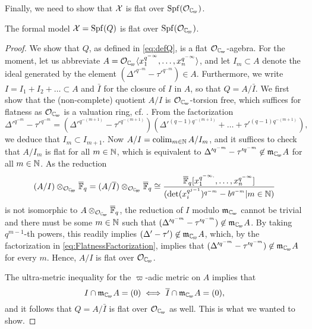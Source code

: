 \documentclass[../main.tex]{subfiles}
\begin{document}
Finally, we need to show that $\mathcal{X}$ is flat over $\spf(\cO_\Cp)$. 

\begin{prop}\label{prop:FlatnessOfFormalModel}
  The formal model $\mathcal{X} = \operatorname{Spf}(Q)$ is flat over $\spf(\cO_\Cp)$. 
\begin{proof}
  We show that $Q$, as defined in \eqref{eq:defQ}, is a flat $\cO_\Cp$-agebra.
  For the moment, let us abbreviate $A = \cO_\Cp\langle x_1^{q^{-\infty}}, \dots, 
  x_n^{q^{-\infty}}\rangle$, 
  and let $I_m \subset A$ denote the ideal generated by the element 
  $(\Delta'^{q^{-m}} - \tau'^{q^{-m}}) \in A$. Furthermore, we write $I = I_1 +
  I_2 + \dots \subset A$ 
  and $\bar I$ for the closure of $I$ in $A$, so that $Q = A/\bar I$. 
  We first show that the (non-complete) quotient $A/I$ is $\cO_\Cp$-torsion free, 
  which suffices for flatness as $\cO_\Cp$ is a valuation ring,
  cf. \cite[\href{https://stacks.math.columbia.edu/tag/0539}{Tag
  0539}]{stacks-project}. From the factorization 
  \begin{equation}\label{eq:FlatnessFactorization}
    \Delta'^{q^{-m}} - \tau'^{q^{-m}} = (\Delta'^{q^{-(m+1)}} - \tau'^{q^{-(m+1)}})
    (\Delta'^{(q-1)q^{-(m+1)}} + \dots + \tau'^{(q-1)q^{-(m+1)}}),
  \end{equation}
  we deduce that $I_{m} \subset I_{m+1}$. Now $A/I = \operatorname*{colim}_{m \in \mathbb{N}} A/I_m$, and
  it suffices to check that $A/I_m$ is flat for all $m \in \mathbb{N}$, which is equivalent
  to $\Delta'^{q^{-m}} - \tau'^{q^{-m}} \not \in \fm_\Cp A$ for all
  $m \in \mathbb{N}$. As the reduction
  $$(A/I) \otimes_{\cO_\Cp} \Fqbar = (A/\bar I) \otimes_{\cO_\Cp}
  \Fqbar \cong \frac{\Fqbar [x_1^{q^{-\infty,}}, \dots,
    x_n^{q^{-\infty}}]}{(\det(x_i^{q^{j-1}})^{q^{-m}}- b^{q^{-m}} | m \in \N)}$$
  is not isomorphic to $A \otimes_{\cO_\Cp} \Fqbar$, the reduction of $I$ modulo
  $\fm_\Cp$ cannot be trivial and there must be some 
  $m \in \mathbb{N}$ such that $(\Delta'^{q^{-m}} - \tau'^{q^{-m}}) \not \in \fm_\Cp A$. 
  By taking $q^{m-1}$-th powers, this readily implies $(\Delta' - \tau') \not \in
  \fm_\Cp A$, which, by the factorization in \eqref{eq:FlatnessFactorization},
  implies that $(\Delta'^{q^{-m}} - \tau'^{q^{-m}}) \not \in \fm_\Cp A$ for every $m$. 
  Hence, $A/I$ is flat over $\cO_\Cp$. 

  The ultra-metric inequality for the $\varpi$-adic metric on $A$ implies that 
  \begin{equation*}
    I \cap \fm_\Cp A = (0) \iff \bar I \cap \fm_\Cp A = (0),
  \end{equation*}
  and it follows that $Q = A/\bar I$ is flat over $\cO_\Cp$ as well. 
  This is what we wanted to show.
\end{proof}
\end{prop}
\end{document}
